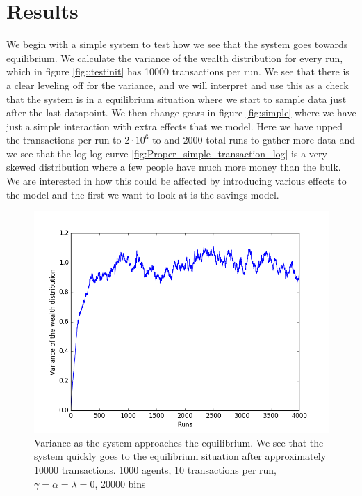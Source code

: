 \documentclass[a4paper,11pt]{article}
\begin{document}
{\section*{Results}

We begin with a simple system to test how we see that the system goes towards equilibrium. We calculate the variance of the wealth distribution for every run, which in figure \ref{fig::testinit} has 10000 transactions per run. We see that there is a clear leveling off for the variance, and we will interpret and use this as a check that the system is in a equilibrium situation where we start to sample data just after the last datapoint. We then change gears in figure \ref{fig:simple} where we have just a simple interaction with extra effects that we model. Here we have upped the transactions per run to $2\cdot 10^6$ to and 2000 total runs to gather more data and we see that the log-log curve \ref{fig:Proper_simple_transaction_log} is a very skewed distribution where a few people have much more money than the bulk. We are interested in how this could be affected by introducing various effects to the model and the first we want to look at is the savings model. 

\begin{figure}[H]
	\centering
	\includegraphics[scale=0.5]{testinit}
	\caption{Variance as the system approaches the equilibrium. We see that the system quickly goes to the equilibrium situation after approximately 10000 transactions.  1000 agents, 10 transactions per run, $\gamma=\alpha=\lambda = 0$,  20000 bins  }
	\label{fig:testinit}
\end{figure}

}
\end{document}
